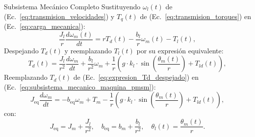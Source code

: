 \documentclass[12pt]{beamer}
\begin{document}
\begin{frame}{Subsistema Mecánico Completo}
    Sustituyendo \( \omega_l(t) \) de (Ec.~\ref{eq:transmision_velocidades}) y \( T_q(t) \) de (Ec.~\ref{eq:transmision_torques}) en (Ec.~\ref{eq:carga_mecanica}):
    \begin{equation}
        \frac{J_l}{r} \frac{d\omega_m(t)}{dt} = r T_d(t) - \frac{b_l}{r} \omega_m(t) - T_l(t),
    \end{equation}
    Despejando \( T_d(t) \) y reemplazando \( T_l(t) \) por su expresión equivalente:
    \begin{equation}
    \label{eq:expresion_Td_despejado}
        T_d(t) = \frac{J_l}{r^2} \frac{d\omega_m}{dt} + \frac{b_l}{r^2} \omega_m + \frac{1}{r} \left(g \cdot k_l \cdot \sin\left(\frac{\theta_m(t)}{r}\right) + T_{ld}(t)\right),
    \end{equation}
    Reemplazando \( T_d(t) \) de (Ec.~\ref{eq:expresion_Td_despejado}) en (Ec.~\ref{eq:subsistema_mecanico_maquina_pmsm}):
    \begin{equation}
        J_{\text{eq}} \frac{d\omega_m}{dt} = -b_{\text{eq}} \omega_m + T_m - \frac{1}{r} \left(g \cdot k_l \cdot \sin\left(\frac{\theta_m(t)}{r}\right) + T_{ld}(t)\right),
    \end{equation}
    con:
    \begin{equation}
        J_{\text{eq}} = J_m + \frac{J_l}{r^2}, \quad
        b_{\text{eq}} = b_m + \frac{b_l}{r^2}, \quad
        \theta_l(t) = \frac{\theta_m(t)}{r}.
    \end{equation}
\end{frame}
\end{document}
